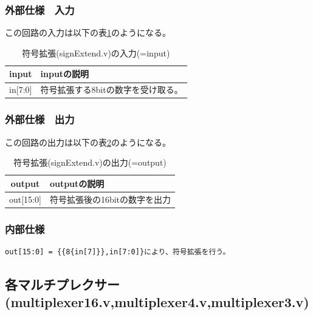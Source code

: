 \documentclass[a4j,titlepage]{jarticle}
\begin{document}
\subsubsection{外部仕様　入力}
この回路の入力は以下の表\ref{signExtendI}のようになる。
\begin{table}[H]
    \caption{符号拡張(signExtend.v)の入力(=input)}
    \label{signExtendI}
    \begin{center}
    \begin {tabularx}{150mm}{|c|X|} \hline
         input & inputの説明 \\ \hline \hline
         in[7:0] & 符号拡張する8bitの数字を受け取る。 \\ \hline
    \end{tabularx}
    \end{center}
\end{table}

\subsubsection{外部仕様　出力}
この回路の出力は以下の表\ref{signExtendO}のようになる。
\begin{table}[H]
    \caption{符号拡張(signExtend.v)の出力(=output)}
    \label{signExtendO}
    \begin{center}
    \begin {tabularx}{150mm}{|c|X|} \hline
         output & outputの説明 \\ \hline \hline
         out[15:0] & 符号拡張後の16bitの数字を出力\\ \hline
    \end {tabularx}
    \end{center}
\end{table}

\subsubsection{内部仕様}

\begin{verbatim}
out[15:0] = {{8{in[7]}},in[7:0]}により、符号拡張を行う。
\end{verbatim}



\newpage
\subsection{各マルチプレクサー(multiplexer16.v,multiplexer4.v,multiplexer3.v)}
\end{document}
